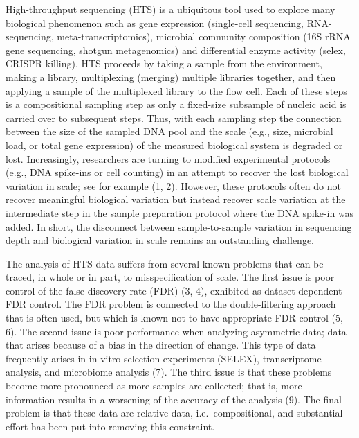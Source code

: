 \documentclass[
]{article}
\begin{document}
High-throughput sequencing (HTS) is a ubiquitous tool used to explore
many biological phenomenon such as gene expression (single-cell
sequencing, RNA-sequencing, meta-transcriptomics), microbial community
composition (16S rRNA gene sequencing, shotgun metagenomics) and
differential enzyme activity (selex, CRISPR killing). HTS proceeds by
taking a sample from the environment, making a library, multiplexing
(merging) multiple libraries together, and then applying a sample of the
multiplexed library to the flow cell. Each of these steps is a
compositional sampling step as only a fixed-size subsample of nucleic
acid is carried over to subsequent steps. Thus, with each sampling step
the connection between the size of the sampled DNA pool and the scale
(e.g., size, microbial load, or total gene expression) of the measured
biological system is degraded or lost. Increasingly, researchers are
turning to modified experimental protocols (e.g., DNA spike-ins or cell
counting) in an attempt to recover the lost biological variation in
scale; see for example (1, 2). However, these protocols often do not
recover meaningful biological variation but instead recover scale
variation at the intermediate step in the sample preparation protocol
where the DNA spike-in was added. In short, the disconnect between
sample-to-sample variation in sequencing depth and biological variation
in scale remains an outstanding challenge.

The analysis of HTS data suffers from several known problems that can be
traced, in whole or in part, to misspecification of scale. The first
issue is poor control of the false discovery rate (FDR) (3, 4),
exhibited as dataset-dependent FDR control. The FDR problem is connected
to the double-filtering approach that is often used, but which is known
not to have appropriate FDR control (5, 6). The second issue is poor
performance when analyzing asymmetric data; data that arises because of
a bias in the direction of change. This type of data frequently arises
in in-vitro selection experiments (SELEX), transcriptome analysis, and
microbiome analysis (7). The third issue is that these problems become
more pronounced as more samples are collected; that is, more information
results in a worsening of the accuracy of the analysis (9). The final
problem is that these data are relative data, i.e.~compositional, and
substantial effort has been put into removing this constraint.
\end{document}
